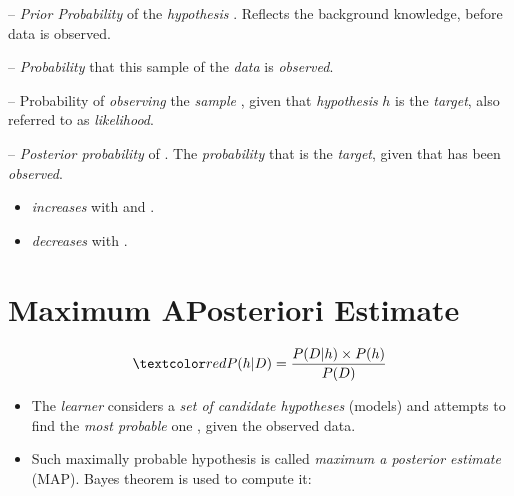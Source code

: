 \documentclass[
	number={3},
	title={Na\"{\i}ive Bayes Learning}
]{cs584notes}
\begin{document}
\begin{description}[font=\color{red}]
	\item[$P(h)$] -- \emph{Prior Probability} of the \emph{hypothesis} . Reflects the background knowledge, before data is observed.
	\item[$P(D)$] -- \emph{Probability} that this sample of the \emph{data} is \emph{observed}.
	\item[$P(D|h)$] -- {Probability} of \emph{observing} the \emph{sample} , given that \emph{hypothesis} $h$ is the \emph{target}, also referred to as \emph{likelihood}.
	\item[$P(h|D)$] -- \emph{Posterior probability} of . The \emph{probability} that  is the \emph{target}, given that  has been \emph{observed}.
\end{description}

\begin{itemize}
	\item {} \emph{increases} with  and .
	\item {} \emph{decreases} with .
\end{itemize}

\section{Maximum APosteriori Estimate}\label{sec:maximum-aposteriori-estimate}
\[ \data{ P(h|D) = \frac{P(D|h)\times P(h)}{P(D)} } \]
\begin{itemize}
	\item The \emph{learner} considers a \emph{set of candidate hypotheses}  (models) and attempts to find the \emph{most probable} one , given the observed data.
	\item Such maximally probable hypothesis is called \emph{maximum a posterior estimate} (MAP). Bayes theorem is used to compute it:
	\data{\begin{equation*}
	\begin{aligned}
		h_{MAP} &= \arg\max_{h\in H}P(h|D)\\
				&= \arg\max_{h\in H}\frac{P(D|h)\times P(h)}{P(D)}\\
				&= \arg\max_{h\in H}P(D|h)\times P(h)\\%
	\end{aligned}
	\end{equation*}}
\end{itemize}
\end{document}
